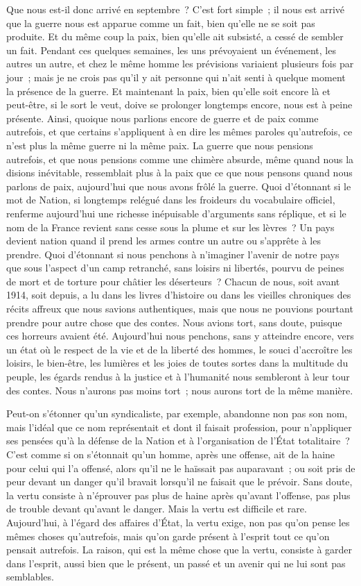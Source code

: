 \documentclass[french,twoside]{book} %
\begin{document}
Que nous est-il donc arrivé en septembre ? C'est fort simple ; il nous est arrivé que la guerre nous est apparue comme un fait, bien qu'elle ne se soit pas produite. Et du même coup la paix, bien qu'elle ait subsisté, a cessé de sembler un fait. Pendant ces quelques semaines, les uns prévoyaient un événement, les autres un autre, et chez le même homme les prévisions variaient plusieurs fois par jour ; mais je ne crois pas qu'il y ait personne qui n'ait senti à quelque moment la présence de la guerre. Et maintenant la paix, bien qu'elle soit encore là et peut-être, si le sort le veut, doive se prolonger longtemps encore, nous est à peine présente. Ainsi, quoique nous parlions encore de guerre et de paix comme autrefois, et que certains s'appliquent à en dire les mêmes paroles qu'autrefois, ce n'est plus la même guerre ni la même paix. La guerre que nous pensions autrefois, et que nous pensions comme une chimère absurde, même quand nous la disions inévitable, ressemblait plus à la paix que ce que nous pensons quand nous parlons de paix, aujourd'hui que nous avons frôlé la guerre. Quoi d'étonnant si le mot de Nation, si longtemps relégué dans les froideurs du vocabulaire officiel, renferme aujourd'hui une richesse inépui­sable d'arguments sans réplique, et si le nom de la France revient sans cesse sous la plume et sur les lèvres ? Un pays devient nation quand il prend les armes contre un autre ou s'apprête à les prendre. Quoi d'étonnant si nous penchons à n'imaginer l'avenir de notre pays que sous l'aspect d'un camp retranché, sans loisirs ni libertés, pourvu de peines de mort et de torture pour châtier les déserteurs ? Chacun de nous, soit avant 1914, soit depuis, a lu dans les livres d'histoire ou dans les vieilles chroniques des récits affreux que nous savions authentiques, mais que nous ne pouvions pourtant prendre pour autre chose que des contes. Nous avions tort, sans doute, puisque ces horreurs avaient été. Aujourd'hui nous penchons, sans y atteindre encore, vers un état où le respect de la vie et de la liberté des hommes, le souci d'accroître les loisirs, le bien-être, les lumières et les joies de toutes sortes dans la multitude du peuple, les égards rendus à la justice et à l'humanité nous sembleront à leur tour des contes. Nous n'aurons pas moins tort ; nous aurons tort de la même manière.\par
Peut-on s'étonner qu'un syndicaliste, par exemple, abandonne non pas son nom, mais l'idéal que ce nom représentait et dont il faisait profession, pour n'appliquer ses pensées qu'à la défense de la Nation et à l'organisation de l'État totalitaire ? C'est comme si on s'étonnait qu'un homme, après une offense, ait de la haine pour celui qui l'a offensé, alors qu'il ne le haïssait pas auparavant ; ou soit pris de peur devant un danger qu'il bravait lorsqu'il ne faisait que le prévoir. Sans doute, la vertu consiste à n'éprouver pas plus de haine après qu'avant l'offense, pas plus de trouble devant qu'avant le danger. Mais la vertu est difficile et rare. Aujourd'hui, à l'égard des affaires d'État, la vertu exige, non pas qu'on pense les mêmes choses qu'autrefois, mais qu'on garde présent à l'esprit tout ce qu'on pensait autrefois. La raison, qui est la même chose que la vertu, consiste à garder dans l'esprit, aussi bien que le présent, un passé et un avenir qui ne lui sont pas semblables.
\end{document}
